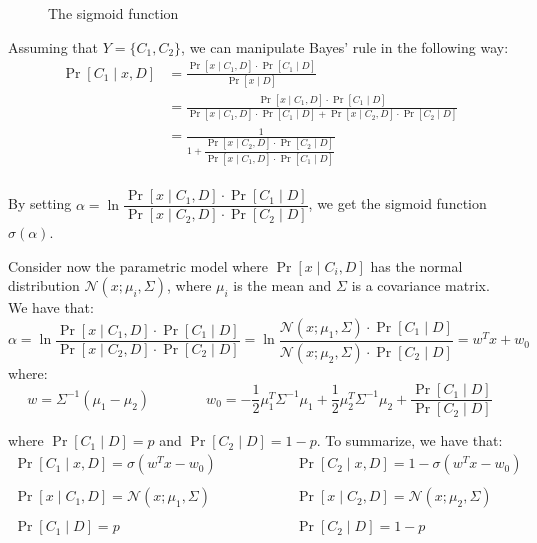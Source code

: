 \documentclass[a4paper, 12pt]{report}
\begin{document}
    \begin{figure}[H]
        \centering
        \caption{The sigmoid function}
    \end{figure}

    Assuming that $Y = \{C_1,C_2\}$, we can manipulate Bayes' rule in the following way:
    \[\begin{split}
        \Pr[C_1 \mid x,D] & = \frac{\Pr[x \mid C_1,D] \cdot \Pr[C_1 \mid D]}{\Pr[x \mid D]} \\
        & = \frac{\Pr[x \mid C_1,D] \cdot \Pr[C_1 \mid D]}{\Pr[x \mid C_1,D] \cdot \Pr[C_1 \mid D] + \Pr[x \mid C_2,D] \cdot \Pr[C_2 \mid D] } \\
        & = \frac{1}{1+\dfrac{\Pr[x \mid C_2,D] \cdot \Pr[C_2 \mid D] }{\Pr[x \mid C_1,D] \cdot \Pr[C_1 \mid D]}} \\
     \end{split}\]

    By setting $\alpha = \ln \dfrac{\Pr[x \mid C_1,D] \cdot \Pr[C_1 \mid D] }{\Pr[x \mid C_2,D] \cdot \Pr[C_2 \mid D]}$, we get the sigmoid function $\sigma(\alpha)$.

    Consider now the parametric model where $\Pr[x \mid C_i,D]$ has the normal distribution $\mathcal{N}(x; \mu_i, \Sigma)$, where $\mu_i$ is the mean and $\Sigma$ is a covariance matrix. We have that:
    \[\alpha = \ln \dfrac{\Pr[x \mid C_1,D] \cdot \Pr[C_1 \mid D] }{\Pr[x \mid C_2,D] \cdot \Pr[C_2 \mid D]} = \ln \dfrac{\mathcal{N}(x; \mu_1, \Sigma) \cdot \Pr[C_1 \mid D] }{\mathcal{N}(x; \mu_2, \Sigma) \cdot \Pr[C_2 \mid D]} = w^Tx+w_0\]
    where:
    \[w = \Sigma^{-1} (\mu_1 - \mu_2) \qquad\qquad w_0 = -\frac{1}{2} \mu_1^T \Sigma^{-1} \mu_1 + \frac{1}{2} \mu_2^T \Sigma^{-1} \mu_2 + \frac{\Pr[C_1 \mid D]}{\Pr[C_2 \mid D]}\]

    where $\Pr[C_1 \mid D] = p$ and $\Pr[C_2 \mid D] = 1-p$. To summarize, we have that:
    \[\begin{array}{ccc}
        \Pr[C_1 \mid x,D] = \sigma(w^Tx-w_0) &\qquad\qquad& \Pr[C_2 \mid x,D] = 1- \sigma(w^Tx-w_0) \\\\
        \Pr[x \mid C_1,D] = \mathcal{N}(x; \mu_1, \Sigma) &\qquad\qquad& \Pr[x \mid C_2,D] = \mathcal{N}(x; \mu_2, \Sigma) \\\\
        \Pr[C_1 \mid D] = p &\qquad\qquad& \Pr[C_2 \mid D] = 1-p 
    \end{array}\]
    
\end{document}
